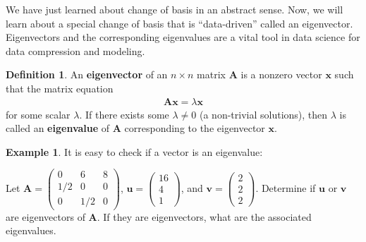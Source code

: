 \documentclass[
]{book}
\theoremstyle{definition}
\newtheorem{definition}{Definition}[chapter]
\theoremstyle{definition}
\newtheorem{example}{Example}[chapter]
\theoremstyle{definition}
\theoremstyle{definition}
\theoremstyle{remark}
\begin{document}
We have just learned about change of basis in an abstract sense. Now, we will learn about a special change of basis that is ``data-driven'' called an eigenvector. Eigenvectors and the corresponding eigenvalues are a vital tool in data science for data compression and modeling.

\begin{definition}
An \textbf{eigenvector} of an \(n \times n\) matrix \(\mathbf{A}\) is a nonzero vector \(\mathbf{x}\) such that the matrix equation
\[
\begin{aligned}
\mathbf{A} \mathbf{x} = \lambda \mathbf{x}
\end{aligned}
\]
for some scalar \(\lambda\). If there exists some \(\lambda \neq 0\) (a non-trivial solutions), then \(\lambda\) is called an \textbf{eigenvalue} of \(\mathbf{A}\) corresponding to the eigenvector \(\mathbf{x}\).
\end{definition}

\begin{example}
It is easy to check if a vector is an eigenvalue:

Let \(\mathbf{A} = \begin{pmatrix} 0 & 6 & 8 \\ 1/2 & 0 & 0 \\ 0 & 1/2 & 0 \end{pmatrix}\), \(\mathbf{u} = \begin{pmatrix} 16 \\ 4 \\ 1 \end{pmatrix}\), and \(\mathbf{v} = \begin{pmatrix} 2 \\ 2 \\ 2 \end{pmatrix}\). Determine if \(\mathbf{u}\) or \(\mathbf{v}\) are eigenvectors of \(\mathbf{A}\). If they are eigenvectors, what are the associated eigenvalues.
\end{example}
\end{document}
